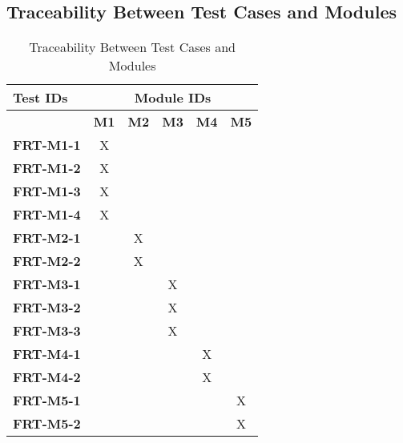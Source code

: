 \documentclass[12pt, titlepage]{article}
\begin{document}
\subsection{Traceability Between Test Cases and Modules}

\begin{longtable}{|l|ccccc|}
	\caption{Traceability Between Test Cases and Modules}                                                                                             \\
	\hline
	\textbf{Test IDs}  & \multicolumn{5}{c|}{\textbf{Module IDs}}                                                                                     \\
	\hline
	~                  & \textbf{M1}                              & \textbf{M2} & \textbf{M3} & \textbf{M4} & \textbf{M5} \\
	\hline
	\textbf{FRT-M1-1}  & X                                        & ~           & ~           & ~           & ~ \\
	\textbf{FRT-M1-2}  & X                                        & ~           & ~           & ~           & ~ \\
	\textbf{FRT-M1-3}  & X                                        & ~           & ~           & ~           & ~ \\
	\textbf{FRT-M1-4}  & X                                        & ~           & ~           & ~           & ~ \\
	\textbf{FRT-M2-1}  & ~                                        & X           & ~           & ~           & ~ \\
	\textbf{FRT-M2-2}  & ~                                        & X           & ~           & ~           & ~ \\
	\textbf{FRT-M3-1}  & ~                                        & ~           & X           & ~           & ~ \\
	\textbf{FRT-M3-2}  & ~                                        & ~           & X           & ~           & ~ \\
	\textbf{FRT-M3-3}  & ~                                        & ~           & X           & ~           & ~ \\
  \textbf{FRT-M4-1}  & ~                                        & ~           & ~           & X           & ~ \\
	\textbf{FRT-M4-2}  & ~                                        & ~           & ~           & X           & ~ \\
	\textbf{FRT-M5-1}  & ~                                        & ~           & ~           & ~           & X \\
	\textbf{FRT-M5-2}  & ~                                        & ~           & ~           & ~           & X \\
	\hline
\end{longtable}
				
\end{document}
